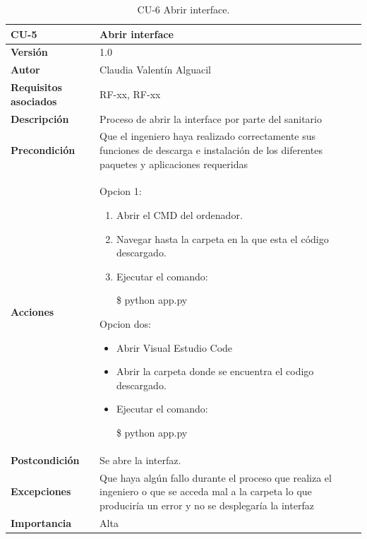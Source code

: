 \begin{table}[p]
	\centering
	\begin{tabularx}{\linewidth}{ p{} p{} }
		\toprule
		\textbf{CU-5}    & \textbf{Abrir interface}\\
		\toprule
		\textbf{Versión}              & 1.0    \\
		\textbf{Autor}                & Claudia Valentín Alguacil \\
		\textbf{Requisitos asociados} & RF-xx, RF-xx \\
		\textbf{Descripción}          & Proceso de abrir la interface por parte del sanitario \\
		\textbf{Precondición}         & Que el ingeniero haya realizado correctamente sus funciones de descarga e instalación de los diferentes paquetes y aplicaciones requeridas \\
		\textbf{Acciones}             &
        Opcion 1: 
		\begin{enumerate}
			\def\labelenumi{\arabic{enumi}.}
			\tightlist
			\item Abrir el CMD del ordenador.
			\item Navegar hasta la carpeta en la que esta el código descargado.
                \item Ejecutar el comando:
                
                \$ python app.py
		\end{enumerate}
        Opcion dos:
        \begin{itemize}
        \def\labelenumi{\arabic{enumi}.}
		  \tightlist
            \item Abrir Visual Estudio Code
            \item Abrir la carpeta donde se encuentra el codigo descargado.
            \item Ejecutar el comando:
                
            \$ python app.py
        \end{itemize} \\
		\textbf{Postcondición}        &  Se abre la interfaz. \\
		\textbf{Excepciones}          & Que haya algún fallo durante el proceso que realiza el ingeniero o que se acceda mal a la carpeta lo que produciría un error y no se desplegaría la interfaz \\
		\textbf{Importancia}          & Alta \\
		\bottomrule
	\end{tabularx}
	\caption{CU-6 Abrir interface.}
\end{table}

